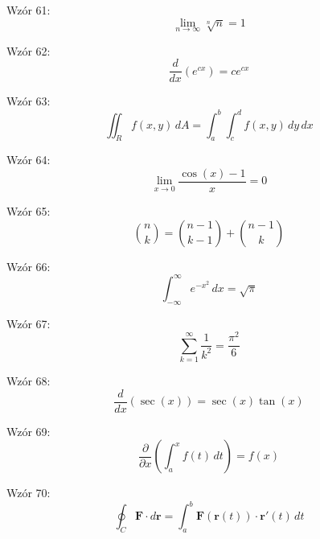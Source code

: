 \documentclass{article}
\begin{document}
Wzór 61:
\[ \lim_{{n \to \infty}} \sqrt[n]{n} = 1 \]

Wzór 62:
\[ \frac{d}{dx}\left(e^{cx}\right) = c e^{cx} \]

Wzór 63:
\[ \iint_R f(x,y) \,dA = \int_{a}^{b} \int_{c}^{d} f(x,y) \,dy\,dx \]

Wzór 64:
\[ \lim_{{x \to 0}} \frac{\cos(x) - 1}{x} = 0 \]

Wzór 65:
\[ \binom{n}{k} = \binom{n-1}{k-1} + \binom{n-1}{k} \]

Wzór 66:
\[ \int_{-\infty}^{\infty} e^{-x^2} \,dx = \sqrt{\pi} \]

Wzór 67:
\[ \sum_{k=1}^{\infty} \frac{1}{k^2} = \frac{\pi^2}{6} \]

Wzór 68:
\[ \frac{d}{dx}\left(\sec(x)\right) = \sec(x) \tan(x) \]

Wzór 69:
\[ \frac{\partial}{\partial x}\left(\int_{a}^{x} f(t) \,dt\right) = f(x) \]

Wzór 70:
\[ \oint_C \mathbf{F} \cdot d\mathbf{r} = \int_{a}^{b} \mathbf{F}(\mathbf{r}(t)) \cdot \mathbf{r}'(t) \,dt \]
\end{document}
